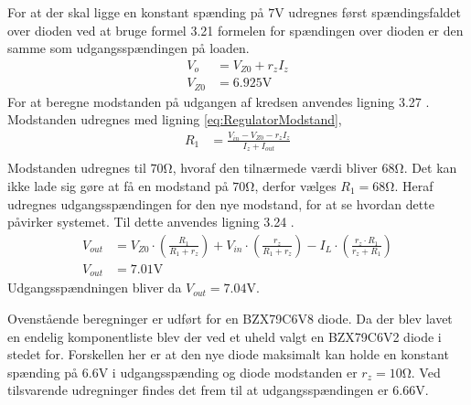 For at der skal ligge en konstant spænding på $7 \si{\volt}$ udregnes først spændingsfaldet over dioden ved at bruge formel 3.21 \cite[Side. 146]{Sedra19uu} formelen for spændingen over dioden er den samme som udgangsspændingen på loaden. 
\begin{align}
	V_o & = V_{Z0} + r_z I_z \\
	V_{Z0} & = 6.925 \si{\volt}
	\end{align}
For at beregne modstanden på udgangen af kredsen anvendes ligning 3.27 \cite[Side. 149]{Sedra19uu}.
Modstanden udregnes med ligning \ref{eq:RegulatorModstand}, 
\begin{align}
	R_1 & = \frac{V_{in}-V_{Z0}-r_z I_z}{I_z+I_{out}} \label{eq:RegulatorModstand} \\
\end{align}
Modstanden udregnes til $70 \si{\ohm}$, hvoraf den tilnærmede værdi bliver $68 \si{\ohm}$.
Det kan ikke lade sig gøre at få en modstand på $70 \si{\ohm}$, derfor vælges $R_1 = 68 \si{\ohm}$.
Heraf udregnes udgangsspændingen for den nye modstand, for at se hvordan dette påvirker systemet.
Til dette anvendes ligning 3.24 \cite[Side. 149]{Sedra19uu}.
\begin{align}
	V_{out} & = V_{Z0} \cdot \left( \frac{R_1}{R_1+r_z} \right) + V_{in} \cdot \left( \frac{r_z}{R_1+r_z} \right) - I_L \cdot \left( \frac{r_z \cdot R_1}{r_z+R_1} \right) \\
	V_{out} & = 7.01 \si{\volt} \label{eq:RegulatorBeregnetPotentiale} 
\end{align}
Udgangsspændningen bliver da $V_{out} = 7.04 \si{\volt}$.

Ovenstående beregninger er udført for en BZX79C6V8 diode. 
Da der blev lavet en endelig komponentliste blev der ved et uheld valgt en BZX79C6V2 diode i stedet for. 
Forskellen her er at den nye diode maksimalt kan holde en konstant spænding på $6.6 \si{\volt}$ i udgangsspænding og diode modstanden er $r_z = 10 \si{\ohm}$.
Ved tilsvarende udregninger findes det frem til at udgangsspændingen er $6.66 \si{\volt}$.